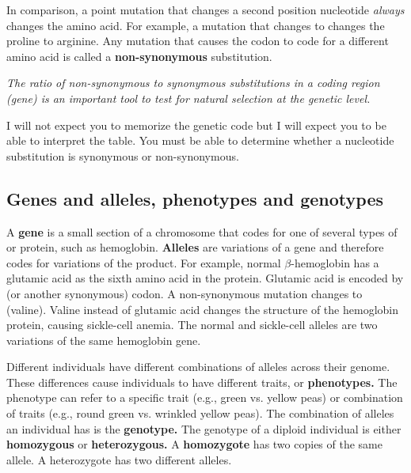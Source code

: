 \documentclass[letterpaper]{tufte-handout}
\begin{document}
In comparison, a point mutation that changes a second position nucleotide \emph{always} changes the amino acid. For example, a mutation that changes  to  changes the proline to arginine. Any mutation that causes the codon to code for a different amino acid is called a \textbf{non-synonymous} substitution.

\emph{The ratio of non-synonymous to synonymous substitutions in a coding region (gene) is an important tool to test for natural selection at the genetic level.}

I will not expect you to memorize the genetic code but I will expect you to be able to interpret the table. You must be able to determine whether a nucleotide substitution is synonymous or non-synonymous.

\subsection*{Genes and alleles, phenotypes and genotypes}

A \textbf{gene} is a small section of a chromosome that codes for one of several types of  or protein, such as hemoglobin. \textbf{Alleles} are variations of a gene and therefore codes for variations of the product. For example, normal $\beta$-hemoglobin has a glutamic acid as the sixth amino acid in the protein. Glutamic acid is encoded by  (or another synonymous) codon. A non-synonymous mutation changes  to  (valine). Valine instead of glutamic acid changes the structure of the hemoglobin protein, causing sickle-cell anemia. The normal and sickle-cell alleles are two variations of the same hemoglobin gene.

Different individuals have different combinations of alleles across their genome. These differences cause individuals to have different traits, or \textbf{phenotypes.} The phenotype can refer to a specific trait (e.g., green vs. yellow peas) or combination of traits (e.g., round green vs. wrinkled yellow peas). The combination of alleles an individual has is the \textbf{genotype.} The genotype of a diploid individual is either \textbf{homozygous} or \textbf{heterozygous.} A \textbf{homozygote} has two copies of the same allele. A heterozygote has two different alleles.
\end{document}
